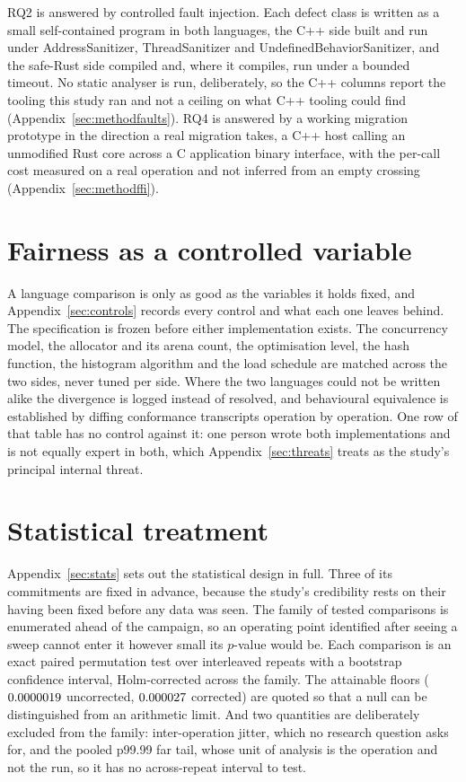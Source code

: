 \documentclass[english,oneside,a4paper,censored,csm,software-track-2020]{HYthesisML}
\begin{document}
RQ2 is answered by controlled fault injection. Each defect class is written as a small
self-contained program in both languages, the C++ side built and run under AddressSanitizer,
ThreadSanitizer and UndefinedBehaviorSanitizer, and the safe-Rust side compiled and, where it
compiles, run under a bounded timeout. No static analyser is run, deliberately, so the C++ columns
report the tooling this study ran and not a ceiling on what C++ tooling could find
(Appendix~\ref{sec:methodfaults}). RQ4 is answered by a working migration prototype in the
direction a real migration takes, a C++ host calling an unmodified Rust core across a C
application binary interface, with the per-call cost measured on a real operation and not inferred
from an empty crossing (Appendix~\ref{sec:methodffi}).

\section{Fairness as a controlled variable}
A language comparison is only as good as the variables it holds fixed, and
Appendix~\ref{sec:controls} records every control and what each one leaves behind. The
specification is frozen before either implementation exists. The concurrency model, the allocator
and its arena count, the optimisation level, the hash function, the histogram algorithm and the
load schedule are matched across the two sides, never tuned per side. Where the two languages
could not be written alike the divergence is logged instead of resolved, and behavioural
equivalence is established by
diffing conformance transcripts operation by operation. One row of that table has no control
against it: one person wrote both implementations and is not equally expert in both, which
Appendix~\ref{sec:threats} treats as the study's principal internal threat.

\section{Statistical treatment}
Appendix~\ref{sec:stats} sets out the statistical design in full. Three of its commitments are
fixed in advance, because the study's credibility rests on their having been fixed before any data
was seen. The family of tested comparisons is enumerated ahead of the campaign, so an operating
point identified after seeing a sweep cannot enter it however small its $p$-value would be. Each
comparison is an exact paired permutation test over \NRepeats{} interleaved repeats with a
bootstrap confidence interval, Holm-corrected across the family. The attainable floors
($0.0000019$ uncorrected, $0.000027$ corrected) are quoted so that a null can be
distinguished from an arithmetic limit. And two quantities are deliberately excluded from the
family: inter-operation jitter, which no research question asks for, and the pooled p99.99 far
tail, whose unit of analysis is the operation and not the run, so it has no across-repeat interval
to test.
\end{document}
